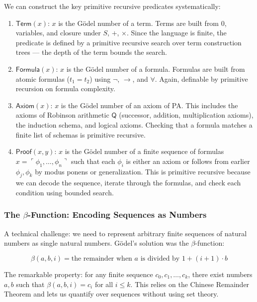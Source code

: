 We can construct the key primitive recursive predicates systematically:

\begin{enumerate}
\item $\mathsf{Term}(x)$: $x$ is the Gödel number of a term. Terms are built from $0$, variables, and closure under $S$, $+$, $\times$. Since the language is finite, the predicate is defined by a primitive recursive search over term construction trees --- the depth of the term bounds the search.

\item $\mathsf{Formula}(x)$: $x$ is the Gödel number of a formula. Formulas are built from atomic formulas ($t_1 = t_2$) using $\neg$, $\to$, and $\forall$. Again, definable by primitive recursion on formula complexity.

\item $\mathsf{Axiom}(x)$: $x$ is the Gödel number of an axiom of PA. This includes the axioms of Robinson arithmetic $\mathsf{Q}$ (successor, addition, multiplication axioms), the induction schema, and logical axioms. Checking that a formula matches a finite list of schemas is primitive recursive.

\item $\mathsf{Proof}(x, y)$: $x$ is the Gödel number of a finite sequence of formulas $x = \ulcorner \phi_1, \dots, \phi_n \urcorner$ such that each $\phi_i$ is either an axiom or follows from earlier $\phi_j, \phi_k$ by modus ponens or generalization. This is primitive recursive because we can decode the sequence, iterate through the formulas, and check each condition using bounded search.
\end{enumerate}

\subsubsection*{The $\beta$-Function: Encoding Sequences as Numbers}

A technical challenge: we need to represent arbitrary finite sequences of natural numbers as single natural numbers. Gödel's solution was the $\beta$-function:

\begin{definition}
\[
\beta(a, b, i) = \text{the remainder when } a \text{ is divided by } 1 + (i+1) \cdot b
\]
\end{definition}

The remarkable property: for any finite sequence $c_0, c_1, \dots, c_k$, there exist numbers $a, b$ such that $\beta(a, b, i) = c_i$ for all $i \le k$. This relies on the Chinese Remainder Theorem and lets us quantify over sequences without using set theory.


